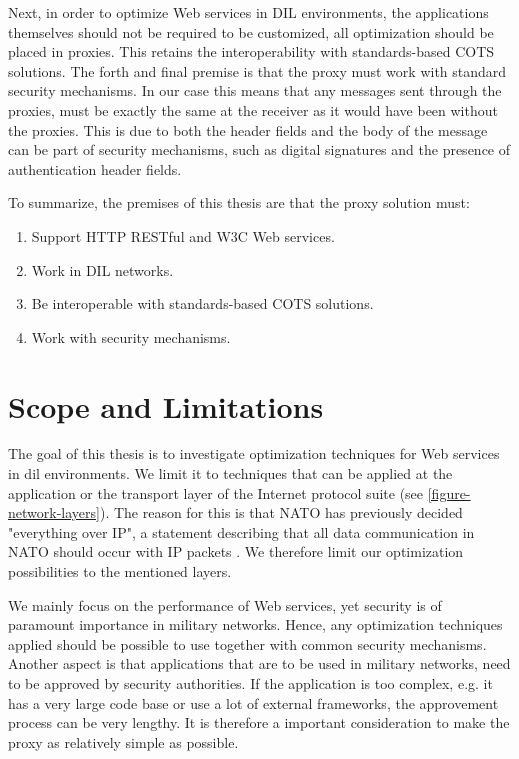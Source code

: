 Next, in order to optimize Web services in DIL environments, the applications
themselves should not be required to be customized, all optimization should be
placed in proxies. This retains the interoperability with standards-based COTS
solutions. The forth and final premise is that the proxy must work with standard
security mechanisms. In our case this means that any messages sent through the
proxies, must be exactly the same at the receiver as it would have been without
the proxies. This is due to both the header fields and the body of the message
can be part of security mechanisms, such as digital signatures and the presence
of authentication header fields.

To summarize, the premises of this thesis are that the proxy solution must:

\begin{enumerate}
    \item Support HTTP RESTful and W3C Web services.
    \item Work in DIL networks.
    \item Be interoperable with standards-based COTS solutions.
    \item Work with security mechanisms.
\end{enumerate}

\section{Scope and Limitations}

The goal of this thesis is to investigate optimization techniques for Web
services in \gls{dil} environments. We limit it to techniques that can be
applied at the application or the transport layer of the Internet protocol
suite (see \cref{figure-network-layers}). The reason for this is that NATO has
previously decided "everything over IP", a statement describing that all data
communication in NATO should occur with IP packets \cite{nnec-study}. We
therefore limit our optimization possibilities to the mentioned layers.

We mainly focus on the performance of Web services, yet security is of paramount
importance in military networks. Hence, any optimization techniques applied
should be possible to use together with common security mechanisms. Another
aspect is that applications that are to be used in military networks, need to be
approved by security authorities. If the application is too complex, e.g. it has
a very large code base or use a lot of external frameworks, the approvement
process can be very lengthy. It is therefore a important consideration to make
the proxy as relatively simple as possible.


